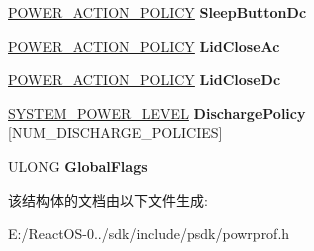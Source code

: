 \begin{DoxyCompactItemize}
\hyperlink{struct___p_o_w_e_r___a_c_t_i_o_n___p_o_l_i_c_y}{P\+O\+W\+E\+R\+\_\+\+A\+C\+T\+I\+O\+N\+\_\+\+P\+O\+L\+I\+CY} {\bfseries Sleep\+Button\+Dc}
\item 
\mbox{\label{struct___g_l_o_b_a_l___u_s_e_r___p_o_w_e_r___p_o_l_i_c_y_ad88b04f8e227b6e124bb5ae23aa5a07d}} 
\hyperlink{struct___p_o_w_e_r___a_c_t_i_o_n___p_o_l_i_c_y}{P\+O\+W\+E\+R\+\_\+\+A\+C\+T\+I\+O\+N\+\_\+\+P\+O\+L\+I\+CY} {\bfseries Lid\+Close\+Ac}
\item 
\mbox{\label{struct___g_l_o_b_a_l___u_s_e_r___p_o_w_e_r___p_o_l_i_c_y_a6bc1ba391fcbb69c2b8460ec3592c6a3}} 
\hyperlink{struct___p_o_w_e_r___a_c_t_i_o_n___p_o_l_i_c_y}{P\+O\+W\+E\+R\+\_\+\+A\+C\+T\+I\+O\+N\+\_\+\+P\+O\+L\+I\+CY} {\bfseries Lid\+Close\+Dc}
\item 
\mbox{\label{struct___g_l_o_b_a_l___u_s_e_r___p_o_w_e_r___p_o_l_i_c_y_a307fb814d5bc254a4613de7ef762d135}} 
\hyperlink{struct___s_y_s_t_e_m___p_o_w_e_r___l_e_v_e_l}{S\+Y\+S\+T\+E\+M\+\_\+\+P\+O\+W\+E\+R\+\_\+\+L\+E\+V\+EL} {\bfseries Discharge\+Policy} \mbox{[}N\+U\+M\+\_\+\+D\+I\+S\+C\+H\+A\+R\+G\+E\+\_\+\+P\+O\+L\+I\+C\+I\+ES\mbox{]}
\item 
\mbox{\label{struct___g_l_o_b_a_l___u_s_e_r___p_o_w_e_r___p_o_l_i_c_y_a24649249bcfdcea909431059bc4abbfc}} 
U\+L\+O\+NG {\bfseries Global\+Flags}
\end{DoxyCompactItemize}


该结构体的文档由以下文件生成\+:\begin{DoxyCompactItemize}
\item 
E\+:/\+React\+O\+S-\/0../sdk/include/psdk/powrprof.\+h\end{DoxyCompactItemize}
